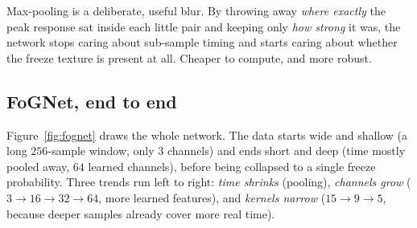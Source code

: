 \begin{intuition}
Max-pooling is a deliberate, useful blur. By throwing away \emph{where exactly} the
peak response sat inside each little pair and keeping only \emph{how strong} it was,
the network stops caring about sub-sample timing and starts caring about whether the
freeze texture is present at all. Cheaper to compute, and more robust.
\end{intuition}

\subsection{FoGNet, end to end}

Figure~\ref{fig:fognet} draws the whole network. The data starts wide and shallow
(a long $256$-sample window, only $3$ channels) and ends short and deep (time mostly
pooled away, $64$ learned channels), before being collapsed to a single freeze
probability. Three trends run left to right: \emph{time shrinks} (pooling),
\emph{channels grow} ($3\!\to\!16\!\to\!32\!\to\!64$, more learned features), and
\emph{kernels narrow} ($15\!\to\!9\!\to\!5$, because deeper samples already cover more
real time).

